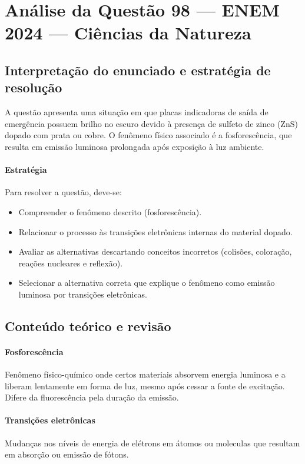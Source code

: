 \documentclass{article}
\begin{document}
\section*{Análise da Questão 98 — ENEM 2024 — Ciências da Natureza}

\subsection*{Interpretação do enunciado e estratégia de resolução}

A questão apresenta uma situação em que placas indicadoras de saída de emergência possuem brilho no escuro devido à presença de sulfeto de zinco (ZnS) dopado com prata ou cobre. O fenômeno físico associado é a fosforescência, que resulta em emissão luminosa prolongada após exposição à luz ambiente.

\paragraph{Estratégia}
Para resolver a questão, deve-se:
\begin{itemize}
  \item Compreender o fenômeno descrito (fosforescência).
  \item Relacionar o processo às transições eletrônicas internas do material dopado.
  \item Avaliar as alternativas descartando conceitos incorretos (colisões, coloração, reações nucleares e reflexão).
  \item Selecionar a alternativa correta que explique o fenômeno como emissão luminosa por transições eletrônicas.
\end{itemize}

\subsection*{Conteúdo teórico e revisão}

\paragraph{Fosforescência}
Fenômeno físico-químico onde certos materiais absorvem energia luminosa e a liberam lentamente em forma de luz, mesmo após cessar a fonte de excitação. Difere da fluorescência pela duração da emissão.

\paragraph{Transições eletrônicas}
Mudanças nos níveis de energia de elétrons em átomos ou moleculas que resultam em absorção ou emissão de fótons.
\end{document}
